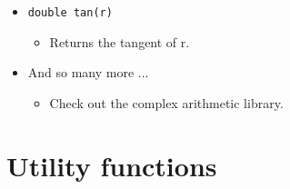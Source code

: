 \begin{itemize}
    \item \texttt{double tan(r)}
        \begin{itemize}
            \item Returns the tangent of r.
        \end{itemize}
    
    \item And so many more ... 
        \begin{itemize}
            \item Check out the complex arithmetic library.
        \end{itemize}
\end{itemize}


\section{Utility functions}
